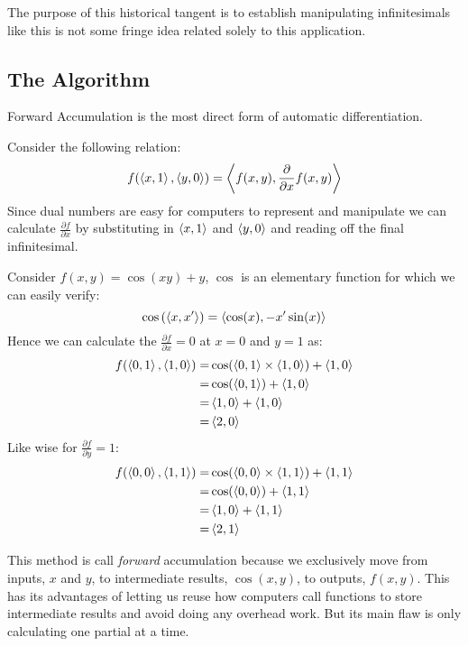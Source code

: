 The purpose of this historical tangent is to establish manipulating infinitesimals like this is not some fringe idea related solely to this application.

\subsection{The Algorithm}
Forward Accumulation is the most direct form of automatic differentiation.

Consider the following relation:
\[f(\left\langle x,1 \right\rangle,\left\langle y,0 \right\rangle) = \left\langle f(x,y),\frac{\partial}{\partial x}f(x,y) \right\rangle\]
Since dual numbers are easy for computers to represent and manipulate we can calculate $\frac{\partial f}{\partial x}$ by substituting in $\left\langle x,1 \right\rangle$ and $\left\langle y,0 \right\rangle$ and reading off the final infinitesimal.

Consider $f(x,y) = \cos(xy)+y$, $\cos$ is an elementary function for which we can easily verify:
\[\cos\left(\left\langle x,x' \right\rangle\right) = \left\langle \cos(x),-x'\sin(x) \right\rangle\]
Hence we can calculate the $\frac{\partial f}{\partial x}=0$ at $x=0$ and $y=1$ as:
\begin{equation*}
\begin{aligned}
	f(\left\langle 0,1 \right\rangle,\left\langle 1,0 \right\rangle) =& \cos(\left\langle 0,1 \right\rangle\times\left\langle 1,0 \right\rangle)+\left\langle 1,0 \right\rangle \\
	=& \cos(\left\langle 0,1 \right\rangle)+\left\langle 1,0 \right\rangle \\
	=& \left\langle 1,0 \right\rangle+\left\langle 1,0 \right\rangle \\
	=& \left\langle 2,0 \right\rangle \\
\end{aligned}
\end{equation*}
Like wise for $\frac{\partial f}{\partial y}=1$:
\begin{equation*}
\begin{aligned}
	f(\left\langle 0,0 \right\rangle,\left\langle 1,1 \right\rangle) =& \cos(\left\langle 0,0 \right\rangle\times\left\langle 1,1 \right\rangle)+\left\langle 1,1 \right\rangle \\
	=& \cos(\left\langle 0,0 \right\rangle)+\left\langle 1,1 \right\rangle \\
	=& \left\langle 1,0 \right\rangle+\left\langle 1,1 \right\rangle \\
	=& \left\langle 2,1 \right\rangle \\
\end{aligned}
\end{equation*}

This method is call {\em forward} accumulation because we exclusively move from inputs, $x$ and $y$, to intermediate results, $\cos(x,y)$, to outputs, $f(x,y)$.
This has its advantages of letting us reuse how computers call functions to store intermediate results and avoid doing any overhead work.
But its main flaw is only calculating one partial at a time.

